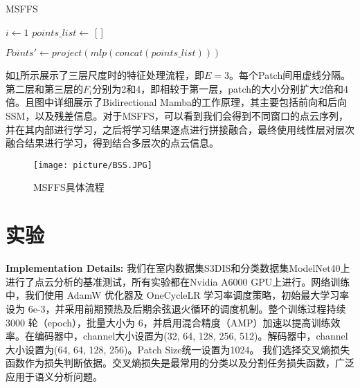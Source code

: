 \documentclass[preprint,12pt]{elsarticle}
\begin{document}
	\begin{algorithm}[H]
		\SetAlgoLined %
		\caption{MSFFS} %
		
		$i \leftarrow 1$ \;
		 $points\_list \leftarrow$ [ ]\;
		
		$Points' \leftarrow project(mlp(concat(points\_list)))$\;
		
	\end{algorithm}

	如\cref{fig:bss}所示展示了三层尺度时的特征处理流程，即$E=3$。每个Patch间用虚线分隔。第二层和第三层的$F_{i}$分别为2和4，即相较于第一层，patch的大小分别扩大2倍和4倍。且图中详细展示了Bidirectional Mamba的工作原理，其主要包括前向和后向SSM，以及残差信息。对于MSFFS，可以看到我们会得到不同窗口的点云序列，并在其内部进行学习，之后将学习结果逐点进行拼接融合，最终使用线性层对层次融合结果进行学习，得到结合多层次的点云信息。

\begin{figure}[htbp]
	\centering
	\texttt{[image: picture/BSS.JPG]}
	\caption{MSFFS具体流程}
	\label{fig:bss}
\end{figure}







\section{实验}
\textbf{Implementation Details:}
我们在室内数据集S3DIS和分类数据集ModelNet40上进行了点云分析的基准测试，所有实验都在Nvidia A6000 GPU上进行。网络训练中，我们使用 AdamW 优化器及 OneCycleLR 学习率调度策略，初始最大学习率设为 6e-3，并采用前期预热及后期余弦退火循环的调度机制。整个训练过程持续 3000 轮（epoch），批量大小为 6，并启用混合精度（AMP）加速以提高训练效率。在编码器中，channel大小设置为(32, 64, 128, 256, 512)。解码器中，channel大小设置为(64, 64, 128, 256)。Patch Size统一设置为1024。
我们选择交叉熵损失函数作为损失判断依据。交叉熵损失是最常用的分类以及分割任务损失函数，广泛应用于语义分析问题。
\end{document}
